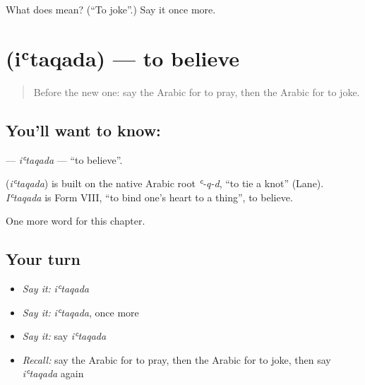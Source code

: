 \begin{tcolorbox}[breakable,colback=teal!4,colframe=teal!35!black,title={Before you move on}]
What does  mean? (\textquotedblleft{}To joke\textquotedblright{}.) Say it once more.
\end{tcolorbox}
\section[\texorpdfstring{\ar{اعتقد} (iʿtaqada)}{اعتقد (iʿtaqada)}]{ (iʿtaqada) — to believe}

\label{lesson:AR-C164-itaqada}



\begin{quote}
Before the new one: say the Arabic for to pray, then the Arabic for to joke.
\end{quote}

\subsection*{You'll want to know: }
\textbf{} — \emph{iʿtaqada} — \textquotedblleft{}to believe\textquotedblright{}.

\begin{cousinweb}
\textbf{} (\emph{iʿtaqada}) is built on the native Arabic root \emph{ʿ-q-d}, \textquotedblleft{}to tie a knot\textquotedblright{} (Lane). \emph{Iʿtaqada} is Form VIII, \textquotedblleft{}to bind one's heart to a thing\textquotedblright{}, to believe.
\end{cousinweb}

\begin{grammarlens}[title={What you've built}]
One more word for this chapter.
\end{grammarlens}

\subsection*{Your turn}
\begin{itemize}
\raggedright
  \item \emph{Say it:} \emph{iʿtaqada}
  \item \emph{Say it:} \emph{iʿtaqada}, once more
  \item \emph{Say it:} say \emph{iʿtaqada}
  \item \emph{Recall:} say the Arabic for to pray, then the Arabic for to joke, then say \emph{iʿtaqada} again
\end{itemize}


